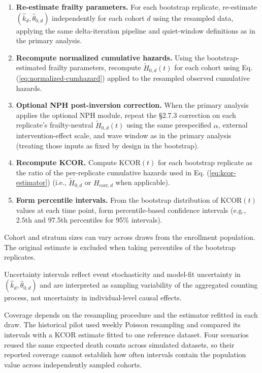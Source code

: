 \documentclass[
]{article}
\begin{document}
\begin{enumerate}
\item
  \textbf{Re-estimate frailty parameters.} For each bootstrap replicate, re-estimate \((\hat{k}_d,\hat{\theta}_{0,d})\) independently for each cohort \(d\) using the resampled data, applying the same delta-iteration pipeline and quiet-window definitions as in the primary analysis.
\item
  \textbf{Recompute normalized cumulative hazards.} Using the bootstrap-estimated frailty parameters, recompute \(\tilde H_{0,d}(t)\) for each cohort using Eq. (\ref{eq:normalized-cumhazard}) applied to the resampled observed cumulative hazards.
\item
  \textbf{Optional NPH post-inversion correction.} When the primary analysis applies the optional NPH module, repeat the §2.7.3 correction on each replicate's frailty-neutral \(\tilde H_{0,d}(t)\) using the same prespecified \(\alpha\), external intervention-effect scale, and wave window as in the primary analysis (treating those inputs as fixed by design in the bootstrap).
\item
  \textbf{Recompute KCOR.} Compute \(\mathrm{KCOR}(t)\) for each bootstrap replicate as the ratio of the per-replicate cumulative hazards used in Eq. (\ref{eq:kcor-estimator}) (i.e., \(\tilde H_{0,d}\) or \(H_{\mathrm{corr},d}\) when applicable).
\item
  \textbf{Form percentile intervals.} From the bootstrap distribution of \(\mathrm{KCOR}(t)\) values at each time point, form percentile-based confidence intervals (e.g., 2.5th and 97.5th percentiles for 95\% intervals).
\end{enumerate}

Cohort and stratum sizes can vary across draws from the enrollment population. The original estimate is excluded when taking percentiles of the bootstrap replicates.

Uncertainty intervals reflect event stochasticity and model-fit uncertainty in \((\hat{k}_d,\hat{\theta}_{0,d})\) and are interpreted as sampling variability of the aggregated counting process, not uncertainty in individual-level causal effects.

Coverage depends on the resampling procedure and the estimator refitted in each draw. The historical pilot used weekly Poisson resampling and compared its intervals with a KCOR estimate fitted to one reference dataset. Four scenarios reused the same expected death counts across simulated datasets, so their reported coverage cannot establish how often intervals contain the population value across independently sampled cohorts.
\end{document}
